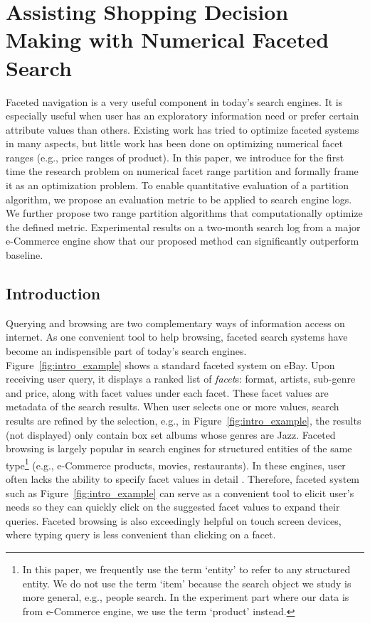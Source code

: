 
\chapter{Assisting Shopping Decision Making with Numerical Faceted Search}
\label{ch2:shopping}

Faceted navigation is a very useful component in today's search engines. It is especially useful when user has an exploratory information need or prefer certain attribute values than others. Existing work has tried to optimize faceted systems in many aspects, but little work has been done on optimizing numerical facet ranges (e.g., price ranges of product). In this paper, we introduce for the first time the research problem on numerical facet range partition and formally frame it as an optimization problem. To enable quantitative evaluation of a partition algorithm, we propose an evaluation metric to be applied to search engine logs. We further propose two range partition algorithms that computationally optimize the defined metric. Experimental results on a two-month search log from a major e-Commerce engine show that our proposed method can significantly outperform baseline.


\section{Introduction}
\label{sec:intro}

Querying and browsing are two complementary ways of information access on internet. As one convenient tool to help browsing, faceted search systems have become an indispensible part of today's search engines. Figure~\ref{fig:intro_example} shows a standard faceted system on eBay. Upon receiving user query, it displays a ranked list of \emph{facet}s: format, artists, sub-genre and price, along with facet values under each facet. These facet values are metadata of the search results. When user selects one or more values, search results are refined by the selection, e.g., in Figure~\ref{fig:intro_example}, the results (not displayed) only contain box set albums whose genres are Jazz. Faceted browsing is largely popular in search engines for structured entities of the same type\footnote{In this paper, we frequently use the term `entity' to refer to any structured entity. We do not use the term `item' because the search object we study is more general, e.g., people search. In the experiment part where our data is from e-Commerce engine, we use the term `product' instead.} (e.g., e-Commerce products, movies, restaurants). In these engines, user often lacks the ability to specify facet values in detail \cite{1555452}. Therefore, faceted system such as Figure~\ref{fig:intro_example} can serve as a convenient tool to elicit user's needs so they can quickly click on the suggested facet values to expand their queries. Faceted browsing is also exceedingly helpful on touch screen devices, where typing query is less convenient than clicking on a facet.

